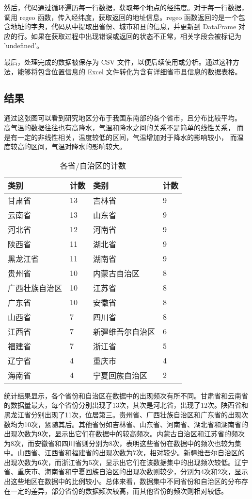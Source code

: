 \documentclass[AutoFakeBold]{LZUThesis-PgD&PhD}
\begin{document}
然后，代码通过循环遍历每一行数据，获取每个地点的经纬度。对于每一行数据，调用 regeo 函数，传入经纬度，获取返回的地址信息。regeo 函数返回的是一个包含地址的字典，代码从中提取出省份、城市和县的信息，并更新到 DataFrame 对应的行。如果在获取过程中出现错误或返回的状态不正常，相关字段会被标记为 'undefined'。

最后，处理完成的数据被保存为 CSV 文件，以便后续使用或分析。通过这种方法，能够将包含位置信息的 Excel 文件转化为含有详细省市县信息的数据表格。
   \subsection{结果}

通过这张图可以看到研究地区分布于我国东南部的各个省市，且分布比较平均。
高气温的数据往往也有高降水，气温和降水之间的关系不是简单的线性关系，
而是有一定的非线性相关，温度较低的区间，气温增加对于降水的影响较小，
而温度较高的区间，气温对降水的影响较大。

   
   \begin{table}[H]
   	\centering
   	\begin{tabular}{ll|ll}
   		\toprule
   		\textbf{类别} & \textbf{计数} & \textbf{类别} & \textbf{计数} \\
   		\midrule
   		甘肃省 & 13 & 吉林省 & 9 \\
   		云南省 & 13 & 山东省 & 9 \\
   		河北省 & 12 & 河南省 & 9 \\
   		陕西省 & 11 & 湖北省 & 9 \\
   		黑龙江省 & 11 & 湖南省 & 9 \\
   		贵州省 & 10 & 内蒙古自治区 & 8 \\
   		广西壮族自治区 & 10 & 江苏省 & 8 \\
   		广东省 & 10 & 安徽省 & 8 \\
   		山西省 & 7 & 四川省 & 8 \\
   		江西省 & 7 & 新疆维吾尔自治区 & 6 \\
   		福建省 & 7 & 浙江省 & 5 \\
   		辽宁省 & 4 & 重庆市 & 4 \\
   		海南省 & 4 & 宁夏回族自治区 & 2 \\
   		\bottomrule
   	\end{tabular}
   	\caption{各省/自治区的计数}
   	\label{tab:category_count}
   \end{table}
   
   
   统计结果显示，各个省份和自治区在数据中的出现频次有所不同。甘肃省和云南省的数据量最大，每个省份分别出现了13次，其次是河北省，出现了12次。陕西省和黑龙江省分别出现了11次，位居第三。贵州省、广西壮族自治区和广东省的出现次数均为10次，紧随其后。其他省份如吉林省、山东省、河南省、湖北省和湖南省的出现次数为9次，显示出它们在数据中的较高频次。内蒙古自治区和江苏省的频次为8次，而安徽省和四川省则分别为8次，表明这些省份在数据中的频次也较为集中。山西省、江西省和福建省的出现次数为7次，相对较少。新疆维吾尔自治区的出现次数为6次，而浙江省为5次，显示出它们在该数据集中的出现频次较低。辽宁省、重庆市、海南省和宁夏回族自治区的出现次数则较少，分别为4次和2次，显示出这些地区在数据中的比例较小。总体来看，数据集中不同省份和自治区的分布存在一定的差异，部分省份的数据频次较高，而其他省份的频次则相对较低。
\end{document}
